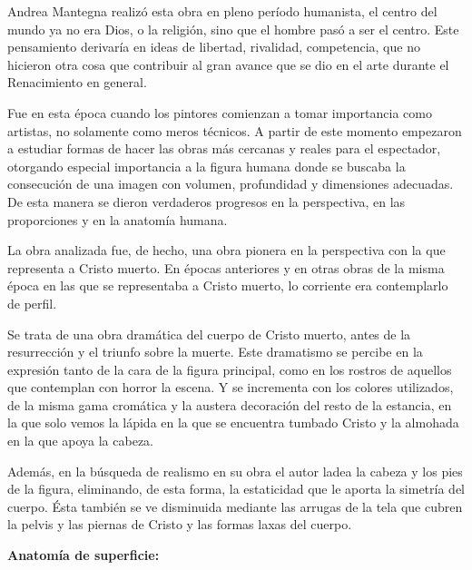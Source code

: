 Andrea Mantegna realizó esta obra en pleno período humanista, el centro del mundo ya no era Dios, o la religión, sino que el hombre pasó a ser el centro. Este pensamiento derivaría en ideas de libertad, rivalidad, competencia, que no hicieron otra cosa que contribuir al gran avance que se dio en el arte durante el Renacimiento en general.

Fue en esta época cuando los pintores comienzan a tomar importancia como artistas, no solamente como meros técnicos. A partir de este momento empezaron a estudiar formas de hacer las obras más cercanas y reales para el espectador, otorgando especial importancia a la figura humana donde se buscaba la consecución de una imagen con volumen, profundidad y dimensiones adecuadas. De esta manera se dieron verdaderos progresos en la perspectiva, en las proporciones y en la anatomía humana.

La obra analizada fue, de hecho, una obra pionera en la perspectiva con la que representa a Cristo muerto. En épocas anteriores y en otras obras de la misma época en las que se representaba a Cristo muerto, lo corriente era contemplarlo de perfil.

Se trata de una obra dramática del cuerpo de Cristo muerto, antes de la resurrección y el triunfo sobre la muerte. Este dramatismo se percibe en la expresión tanto de la cara de la figura principal, como en los rostros de aquellos que contemplan con horror la escena. Y se incrementa con los colores utilizados, de la misma gama cromática y la austera decoración del resto de la estancia, en la que solo vemos la lápida en la que se encuentra tumbado Cristo y la almohada en la que apoya la cabeza.

Además, en la búsqueda de realismo en su obra el autor ladea la cabeza y los pies de la figura, eliminando, de esta forma, la estaticidad que le aporta la simetría del cuerpo. Ésta también se ve disminuida mediante las arrugas de la tela que cubren la pelvis y las piernas de Cristo y las formas laxas del cuerpo.



\vspace{12pt}
\textbf{Anatomía de superficie:}


